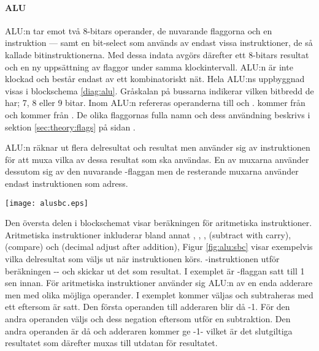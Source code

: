 \documentclass[main.tex]{subfiles}
\begin{document}
\paragraph{ALU}
ALU:n tar emot två 8-bitars operander, de nuvarande flaggorna och en
instruktion --- samt en bit-select som används av endast vissa instruktioner,
de så kallade bitinstruktionerna. Med dessa indata avgörs därefter ett 8-bitars
resultat och en ny uppsättning av flaggor under samma klockintervall. ALU:n är
inte klockad och består endast av ett kombinatoriskt nät. Hela ALU:ns
uppbyggnad visas i blockschema \ref{diag:alu}. Gråskalan på bussarna indikerar
vilken bitbredd de har; 7, 8 eller 9 bitar. Inom ALU:n refereras operanderna
till  och .  kommer från  och
 kommer från . De olika flaggornas fulla namn och dess
användning beskrivs i sektion \ref{sec:theory:flags} på sidan
\pageref{sec:theory:flags}.

ALU:n räknar ut flera delresultat och resultat men använder sig av
instruktionen för att muxa vilka av dessa resultat som ska användas. En av
muxarna använder dessutom sig av den nuvarande -flaggan men de
resterande muxarna använder endast instruktionen som adress.

\begin{SCfigure}
    \centering
    \texttt{[image: alusbc.eps]}
    \caption{Resultat och delresultat som muxas då -instruktionen
    utförs och -flaggan är satt.}
    \label{fig:alu:sbc}
\end{SCfigure}

Den översta delen i blockschemat visar beräkningen för aritmetiska
instruktioner. Aritmetiska instruktioner inkluderar bland annat ,
, ,  (subtract with carry),  (compare)
och  (decimal adjust after addition), Figur \ref{fig:alu:sbc} visar
exempelvis vilka delresultat som väljs ut när instruktionen  körs.
-instruktionen utför beräkningen -- och
skickar ut det som resultat. I exemplet är -flaggan satt till 1 sen
innan. För aritmetiska instruktioner använder sig ALU:n av en enda adderare men
med olika möjliga operander. I exemplet kommer  väljas och
subtraheras med ett eftersom  är satt. Den första operanden till
adderaren blir då -1. För den andra operanden väljs  och
dess negation eftersom  utför en subtraktion.  Den andra operanden är
då  och adderaren kommer ge -1- vilket är det
slutgiltiga resultatet som därefter muxas till utdatan för resultatet.
\end{document}
